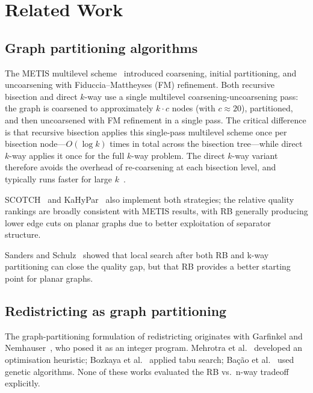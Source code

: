 \section{Related Work}
\label{sec:related}

\subsection{Graph partitioning algorithms}

The METIS multilevel scheme~\citep{karypis1998} introduced coarsening,
initial partitioning, and uncoarsening with Fiduccia--Mattheyses (FM)
refinement.
Both recursive bisection and direct $k$-way use a single multilevel
coarsening-uncoarsening pass: the graph is coarsened to approximately
$k \cdot c$ nodes (with $c \approx 20$), partitioned, and then
uncoarsened with FM refinement in a single pass.
The critical difference is that recursive bisection applies this
single-pass multilevel scheme once per bisection node---$O(\log k)$ times
in total across the bisection tree---while direct $k$-way applies it once
for the full $k$-way problem.
The direct $k$-way variant therefore avoids the overhead of re-coarsening
at each bisection level, and typically runs faster for large
$k$~\citep{karypis1999multilevel}.

SCOTCH~\citep{pellegrini2008scotch} and KaHyPar~\citep{kahypar2017} also
implement both strategies; the relative quality rankings are broadly
consistent with METIS results, with RB generally producing lower edge cuts
on planar graphs due to better exploitation of separator structure.

Sanders and Schulz~\citep{sanders2013think} showed that local search after
both RB and k-way partitioning can close the quality gap, but that RB
provides a better starting point for planar graphs.

\subsection{Redistricting as graph partitioning}

The graph-partitioning formulation of redistricting originates with
Garfinkel and Nemhauser~\citep{garfinkel1970optimal}, who posed it as an
integer program.  Mehrotra et al.~\citep{mehrotra1998optimal} developed an
optimisation heuristic; Bozkaya et al.~\citep{bozkaya2003zone} applied tabu
search; Bação et al.~\citep{bacao2005applying} used genetic algorithms.
None of these works evaluated the RB vs.\ n-way tradeoff explicitly.

